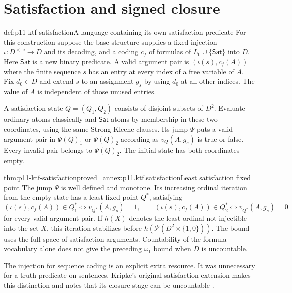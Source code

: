 \section{Satisfaction and signed closure}

\begin{hbdefinition}{def:p11-ktf-satisfaction}{A language containing its own satisfaction predicate}
For this construction suppose the base structure supplies a fixed injection
\(\iota:D^{<\omega}\to D\) and its decoding, and a coding
\(c_f\) of formulas of \(L_0\cup\{\mathsf{Sat}\}\) into \(D\).
Here \(\mathsf{Sat}\) is a new binary predicate. A valid argument pair
is \((\iota(s),c_f(A))\) where the finite sequence \(s\) has an
entry at every index of a free variable of \(A\).
Fix \(d_0\in D\) and extend \(s\) to an assignment \(g_s\) by
using \(d_0\) at all other indices. The value of \(A\) is independent
of those unused entries.

A satisfaction state \(Q=(Q_1,Q_2)\) consists of disjoint subsets of
\(D^2\). Evaluate ordinary atoms classically and \(\mathsf{Sat}\)
atoms by membership in these two coordinates, using the same
Strong-Kleene clauses. Its jump \(\Psi\) puts a valid argument pair
in \(\Psi(Q)_1\) or \(\Psi(Q)_2\) according as
\(v_Q(A,g_s)\) is true or false. Every invalid pair belongs to
\(\Psi(Q)_2\). The initial state has both coordinates empty.
\end{hbdefinition}

\begin{hbtheorem}{thm:p11-ktf-satisfaction}{proved=annex:p11.ktf.satisfaction}{Least satisfaction fixed point}
The jump \(\Psi\) is well defined and monotone. Its increasing ordinal
iteration from the empty state has a least fixed point \(Q^*\), satisfying
\[
 (\iota(s),c_f(A))\in Q^*_1
 \Longleftrightarrow v_{Q^*}(A,g_s)=1,
 \qquad
 (\iota(s),c_f(A))\in Q^*_2
 \Longleftrightarrow v_{Q^*}(A,g_s)=0
\]
for every valid argument pair. If \(h(X)\) denotes the least ordinal
not injectible into the set \(X\), this iteration stabilizes before
\(h(\mathcal P(D^2\times\{1,0\}))\).
The bound uses the full space of satisfaction arguments. Countability of
the formula vocabulary alone does not give the preceding \(\omega_1\)
bound when \(D\) is uncountable.
\end{hbtheorem}

The injection for sequence coding is an explicit extra resource. It was
unnecessary for a truth predicate on sentences. Kripke's original
satisfaction extension makes this distinction and notes that its closure
stage can be uncountable \cite[pp.~705--706]{Kripke1975}.


